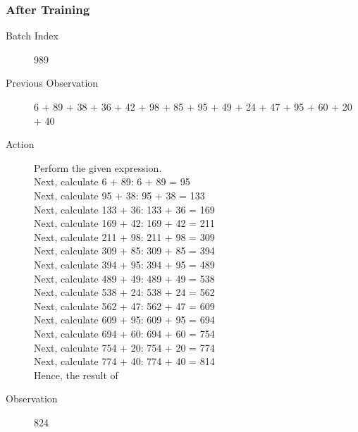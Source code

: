 \documentclass{article}
\begin{document}
\subsubsection{After Training}
\begin{description}
    \item[Batch Index] 989
    \item[Previous Observation] 6 + 89 + 38 + 36 + 42 + 98 + 85 + 95 + 49 + 24 + 47 + 95 + 60 + 20 + 40
    \item[Action] Perform the given expression.\\[1ex]
    Next, calculate 6 + 89: 6 + 89 = 95\\[1ex]
    Next, calculate 95 + 38: 95 + 38 = 133\\[1ex]
    Next, calculate 133 + 36: 133 + 36 = 169\\[1ex]
    Next, calculate 169 + 42: 169 + 42 = 211\\[1ex]
    Next, calculate 211 + 98: 211 + 98 = 309\\[1ex]
    Next, calculate 309 + 85: 309 + 85 = 394\\[1ex]
    Next, calculate 394 + 95: 394 + 95 = 489\\[1ex]
    Next, calculate 489 + 49: 489 + 49 = 538\\[1ex]
    Next, calculate 538 + 24: 538 + 24 = 562\\[1ex]
    Next, calculate 562 + 47: 562 + 47 = 609\\[1ex]
    Next, calculate 609 + 95: 609 + 95 = 694\\[1ex]
    Next, calculate 694 + 60: 694 + 60 = 754\\[1ex]
    Next, calculate 754 + 20: 754 + 20 = 774\\[1ex]
    Next, calculate 774 + 40: 774 + 40 = 814\\[1ex]
    Hence, the result of
    \item[Observation] 824
\end{description}
\end{document}
